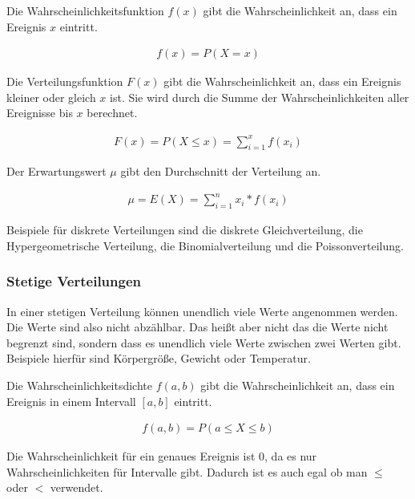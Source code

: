 \documentclass[12pt]{scrartcl}
\begin{document}
Die Wahrscheinlichkeitsfunktion $f(x)$ gibt die Wahrscheinlichkeit an, dass ein Ereignis $x$ eintritt.\par

\begin{align*}
    f(x) = P(X=x)
\end{align*}

Die Verteilungsfunktion $F(x)$ gibt die Wahrscheinlichkeit an, dass ein Ereignis kleiner oder gleich $x$ ist.
Sie wird durch die Summe der Wahrscheinlichkeiten aller Ereignisse bis $x$ berechnet.\par

\begin{align*}
    F(x) = P(X \leq x) = \sum_{i=1}^{x} f(x_i)
\end{align*}

Der Erwartungswert $\mu$ gibt den Durchschnitt der Verteilung an.\par

\begin{align*}
    \mu = E(X) = \sum_{i=1}^{n} x_i * f(x_i)
\end{align*}

Beispiele für diskrete Verteilungen sind die diskrete Gleichverteilung, die Hypergeometrische Verteilung, die Binomialverteilung und die Poissonverteilung.

\subsubsection{Stetige Verteilungen}

In einer stetigen Verteilung können unendlich viele Werte angenommen werden. Die Werte sind also nicht abzählbar.
Das heißt aber nicht das die Werte nicht begrenzt sind, sondern dass es unendlich viele Werte zwischen zwei Werten gibt.
Beispiele hierfür sind Körpergröße, Gewicht oder Temperatur.\par

Die Wahrscheinlichkeitsdichte $f(a,b)$ gibt die Wahrscheinlichkeit an, dass ein Ereignis in einem Intervall $[a,b]$ eintritt.\par

\begin{align*}
    f(a,b) = P(a \leq X \leq b)
\end{align*}

Die Wahrscheinlichkeit für ein genaues Ereignis ist 0, da es nur Wahrscheinlichkeiten für Intervalle gibt.
Dadurch ist es auch egal ob man $\leq$ oder $<$ verwendet.\par
\end{document}
